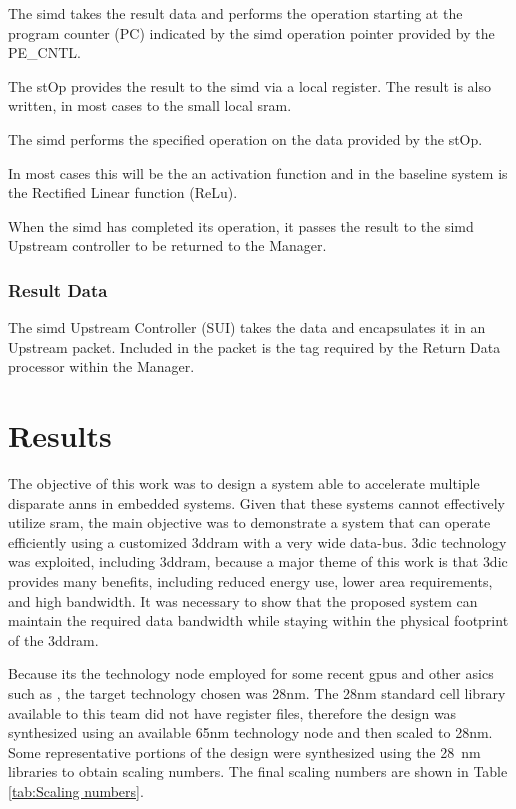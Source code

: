 \documentclass[journal]{IEEEtran}
\begin{document}
The \ac{simd} takes the result data and performs the operation starting at the program counter (PC) indicated by the \ac{simd} operation pointer provided by the PE\_CNTL.

The stOp provides the result to the \ac{simd} via a local register. The result is also written, in most cases to the small local \ac{sram}.

The \ac{simd} performs the specified operation on the data provided by the stOp.

In most cases this will be the \ac{an} activation function and in the baseline system is the Rectified Linear function (ReLu).

When the \ac{simd} has completed its operation, it passes the result to the \ac{simd} Upstream controller to be returned to the Manager.

\subsubsection{Result Data}
\label{ssec:result}

The \ac{simd} Upstream Controller (SUI) takes the data and encapsulates it in an Upstream packet. Included in the packet is the tag required by the Return Data processor within the Manager.

\fi


\section{Results}
\label{sec:Results}
The objective of this work was to design a system able to accelerate multiple disparate \acp{ann} in embedded systems.
Given that these systems cannot effectively utilize \ac{sram}, the main objective was to demonstrate a system that can operate efficiently using a customized \ac{3ddram} with a very wide data-bus.
\ac{3dic} technology was exploited, including \ac{3ddram}, because a major theme of this work is that \ac{3dic} provides many benefits, including reduced energy use, lower area requirements, and high bandwidth. 
It was necessary to show that the proposed system can maintain the required data bandwidth while staying within the physical footprint of the \ac{3ddram}. 

Because its the technology node employed for some recent \acp{gpu} and other \acp{asic} such as \cite{jouppi2017datacenter}, the target technology chosen was 28nm.
The 28nm standard cell library available to this team did not have register files, therefore the design was synthesized using an available 65nm technology node and then scaled to 28nm.
Some representative portions of the design were synthesized using the \SI{28}{\nano\meter} libraries to obtain scaling numbers.
The final scaling numbers are shown in Table \ref{tab:Scaling numbers}.
\end{document}
